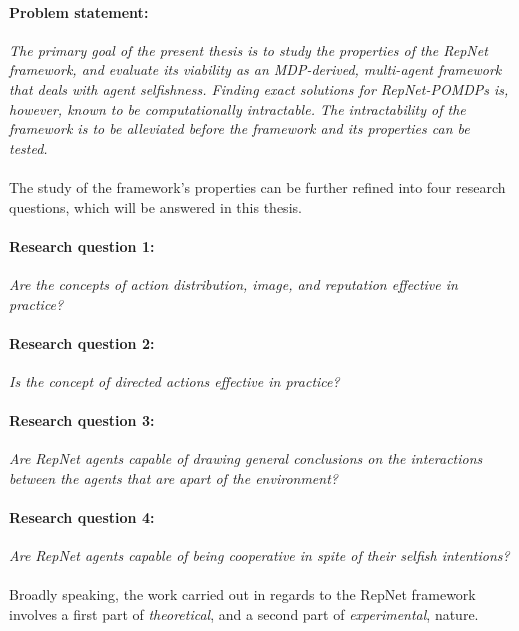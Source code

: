 \paragraph{Problem statement:} \textit{The primary goal of the present thesis is to study the properties of the RepNet framework, and evaluate its viability as an MDP-derived, multi-agent framework that deals with agent selfishness. Finding exact solutions for RepNet-POMDPs is, however, known to be computationally \textit{intractable}. The intractability of the framework is to be alleviated before the framework and its properties can be tested.}

\paragraph*{}The study of the framework's properties can be further refined into four research questions, which will be answered in this thesis.

\paragraph{Research question 1:} \textit{Are the concepts of action distribution, image, and reputation effective in practice?}

\paragraph{Research question 2:} \textit{Is the concept of directed actions effective in practice?}

\paragraph{Research question 3:} \textit{Are RepNet agents capable of drawing general conclusions on the interactions between the agents that are apart of the environment?}

\paragraph{Research question 4:} \textit{Are RepNet agents capable of being cooperative in spite of their selfish intentions?}






\paragraph*{}Broadly speaking, the work carried out in regards to the RepNet framework involves a first part of \textit{theoretical}, and a second part of \textit{experimental}, nature.

